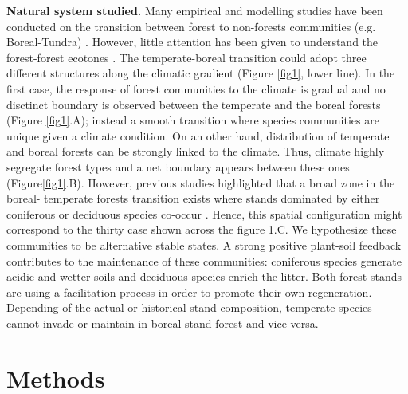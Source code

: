 \textbf{Natural system studied.} Many empirical and modelling studies have
been conducted on the transition between forest to non-forests communities
(e.g. Boreal-Tundra) \cite{Scheffer2012,Scheffer2001,Hirota2011,Messaoud2007}.
However, little attention has been given to understand the  forest-forest
ecotones \cite{Goldblum2010,Graignic2013,Messaoud2007}.  The temperate-boreal
transition could adopt three different structures along the climatic gradient
(Figure \ref{fig1}, lower line). In the first case, the
response of forest communities to the climate is gradual and no disctinct
boundary is observed between the temperate and the boreal forests (Figure \ref{fig1}.A); instead a
smooth transition where species communities are unique given a climate
condition.  On an other hand, distribution of temperate and boreal forests can
be strongly linked to the climate. Thus, climate highly segregate  forest
types and a net boundary appears between these ones (Figure\ref{fig1}.B).
However, previous studies highlighted that a broad zone in the boreal-
temperate forests transition exists where stands dominated by either
coniferous or deciduous species co-occur \cite{Goldblum2010,Fisichelli2013}.
Hence, this spatial configuration might correspond to the thirty case shown
across the figure 1.C. We hypothesize these communities to be alternative
stable states. A strong positive plant-soil feedback contributes to the
maintenance of these communities: coniferous species generate acidic and
wetter soils and deciduous species enrich the litter. Both forest stands are
using a facilitation process in order to promote their own regeneration.
Depending of the actual or historical stand composition, temperate species
cannot invade or maintain in boreal stand forest and vice versa.


\section{Methods}   

